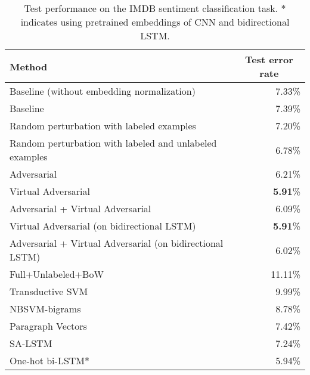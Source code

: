 \documentclass{article}
\begin{document}
\begin{table}[ht]
		\caption{\label{tab:imdb_error}Test performance on the IMDB sentiment classification task. * indicates using pretrained
		embeddings of CNN and bidirectional LSTM.}
\centering
		\begin{tabular}{lr}
			\toprule
			\textbf{Method} & \multicolumn{1}{c}{\textbf{Test error rate}} \\
			\midrule
			Baseline (without embedding normalization) & 7.33\% \\
			\midrule
			Baseline & 7.39\% \\
			Random perturbation with labeled examples & 7.20\% \\
			Random perturbation with labeled and unlabeled examples & 6.78\% \\
			Adversarial & 6.21\% \\
			Virtual Adversarial & \textbf{5.91}\% \\
			Adversarial + Virtual Adversarial & 6.09\% \\
			\midrule
			Virtual Adversarial (on bidirectional LSTM) & \textbf{5.91}\% \\
			Adversarial + Virtual Adversarial (on bidirectional LSTM) & 6.02\% \\
			\midrule
			Full+Unlabeled+BoW~\cite[]{maas2011learning} & 11.11\% \\
                        Transductive SVM~\cite[]{johnson2015semi} & 9.99\% \\
                        NBSVM-bigrams \cite[]{wang2012baselines} & 8.78\% \\
			Paragraph Vectors~\cite[]{le2014distributed} & 7.42\% \\
			SA-LSTM~\cite[]{dai2015semi} & 7.24\% \\
			One-hot bi-LSTM*~\cite[]{johnson2016supervised} & 5.94\% \\
			\bottomrule
		\end{tabular}
\end{table}
\end{document}
